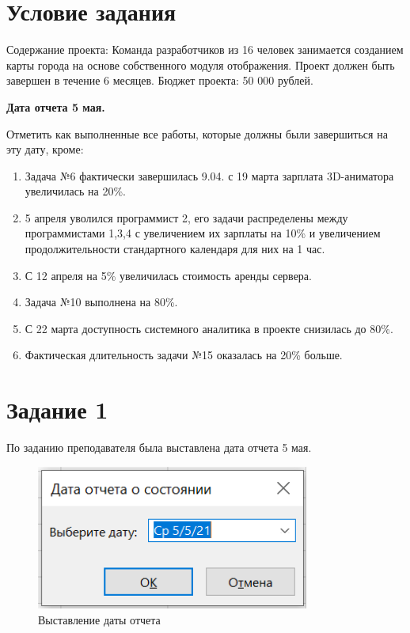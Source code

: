 \section{Условие задания}

Содержание проекта: Команда разработчиков из 16 человек занимается созданием карты города на основе собственного модуля отображения. Проект должен быть завершен в течение 6 месяцев. Бюджет проекта: 50 000 рублей.

\textbf{Дата отчета 5 мая.}

Отметить как выполненные все работы, которые должны были завершиться на эту дату, кроме:

\begin{enumerate}
    \item Задача №6 фактически завершилась 9.04. с 19 марта зарплата 3D-аниматора увеличилась на 20\%.
    \item 5 апреля уволился программист 2, его задачи распределены между программистами 1,3,4 с увеличением их зарплаты на 10\% и увеличением продолжительности стандартного календаря для них на 1 час.
    \item С 12 апреля на 5\% увеличилась стоимость аренды сервера.
    \item Задача №10 выполнена на 80\%.
    \item С 22 марта доступность системного аналитика в проекте снизилась до 80\%.
    \item Фактическая длительность задачи №15 оказалась на 20\% больше.
\end{enumerate}

\section{Задание 1}

По заданию преподавателя была выставлена дата отчета 5 мая.

\begin{figure}[H]
    \centering
    \includegraphics[width=0.8\textwidth]{img/content/task_1.png}
    \caption{Выставление даты отчета}
    \label{fig:task_1}
\end{figure}

